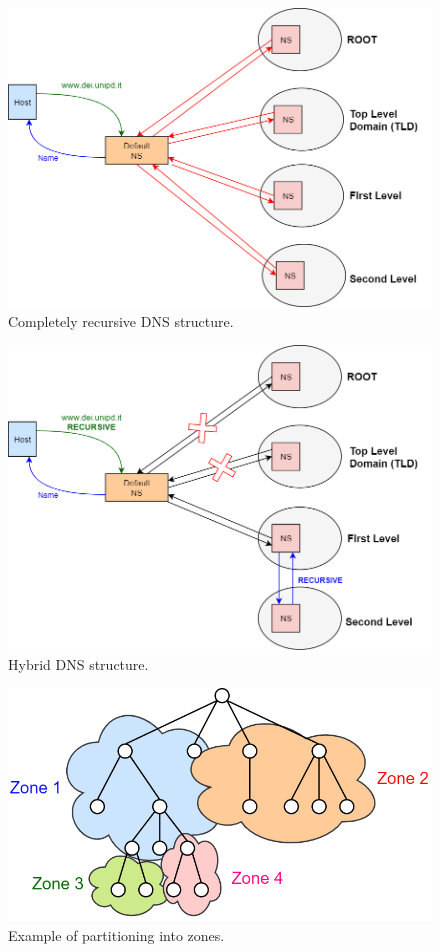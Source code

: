 \begin{figure}[h]
\centering
\includegraphics[scale=0.4]{Images/Resolution/default_DNS}
\caption{\footnotesize{Completely recursive DNS structure.}}\label{recursive_DNS}
\end{figure}
\begin{figure}[h]
\centering
\includegraphics[scale=0.4]{Images/Resolution/hybrid_DNS}
\caption{\footnotesize{Hybrid DNS structure.}}\label{hybrid_DNS}
\end{figure}
\begin{figure}[H]
\centering
\includegraphics[scale=0.4]{Images/Resolution/DNS_zone}
\caption{\footnotesize{Example of partitioning into zones.}}\label{DNS_zone}
\end{figure}